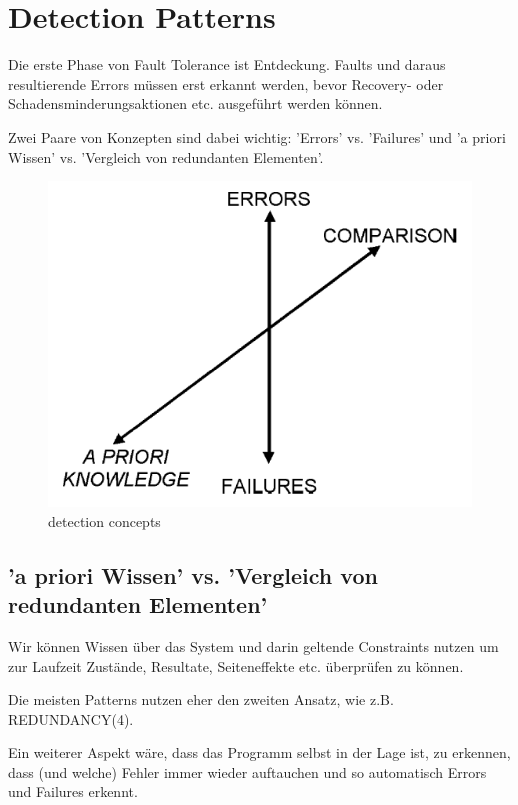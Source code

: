 \section{Detection Patterns}


Die erste Phase von Fault Tolerance ist Entdeckung. Faults und daraus resultierende Errors müssen erst erkannt werden, bevor Recovery- oder Schadensminderungsaktionen etc. ausgeführt werden können.

Zwei Paare von Konzepten sind dabei wichtig: 'Errors' vs. 'Failures' und 'a priori Wissen' vs. 'Vergleich von redundanten Elementen'.
\begin{figure}[H]
	\centering
	\includegraphics[width=\textwidth]{content/faulttolerance/images/detection_concepts.png}
	\caption{detection concepts}
\end{figure}


\subsection*{'a priori Wissen' vs. 'Vergleich von redundanten Elementen'}


Wir können Wissen über das System und darin geltende Constraints nutzen um zur Laufzeit Zustände, Resultate, Seiteneffekte etc. überprüfen zu können.

Die meisten Patterns nutzen eher den zweiten Ansatz, wie z.B. REDUNDANCY(4).

Ein weiterer Aspekt wäre, dass das Programm selbst in der Lage ist, zu erkennen, dass (und welche) Fehler immer wieder auftauchen und so automatisch Errors und Failures erkennt.

